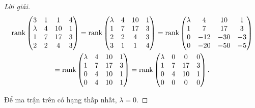 \begin{proof}[Lời giải]
    \begingroup{}
    \allowdisplaybreaks{}
    \begin{gather*}
        \text{rank}\begin{pmatrix}
            3       & 1 & 1  & 4 \\
            \lambda & 4 & 10 & 1 \\
            1       & 7 & 17 & 3 \\
            2       & 2 & 4  & 3
        \end{pmatrix}
        =\text{rank}\begin{pmatrix}
            \lambda & 4 & 10 & 1 \\
            1       & 7 & 17 & 3 \\
            2       & 2 & 4  & 3 \\
            3       & 1 & 1  & 4 \\
        \end{pmatrix}
        =\text{rank}\begin{pmatrix}
            \lambda & 4   & 10  & 1  \\
            1       & 7   & 17  & 3  \\
            0       & -12 & -30 & -3 \\
            0       & -20 & -50 & -5 \\
        \end{pmatrix} \\
        =\text{rank}\begin{pmatrix}
            \lambda & 4 & 10 & 1 \\
            1       & 7 & 17 & 3 \\
            0       & 4 & 10 & 1 \\
            0       & 4 & 10 & 1 \\
        \end{pmatrix}
        =\text{rank}\begin{pmatrix}
            \lambda & 0 & 0  & 0 \\
            1       & 7 & 17 & 3 \\
            0       & 4 & 10 & 1 \\
            0       & 0 & 0  & 0 \\
        \end{pmatrix}.
    \end{gather*}
    \endgroup{}
    
    Để ma trận trên có hạng thấp nhất, $\lambda = 0$.
\end{proof}

